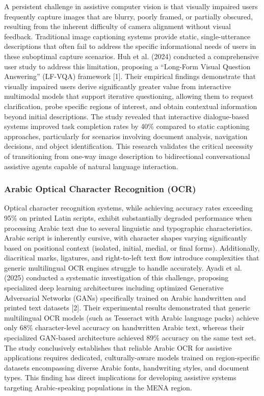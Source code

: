 \documentclass[a4paper]{report}
\begin{document}
A persistent challenge in assistive computer vision is that visually impaired users frequently capture images that are blurry, poorly framed, or partially obscured, resulting from the inherent difficulty of camera alignment without visual feedback. Traditional image captioning systems provide static, single-utterance descriptions that often fail to address the specific informational needs of users in these suboptimal capture scenarios. Huh et al. (2024) conducted a comprehensive user study to address this limitation, proposing a ``Long-Form Visual Question Answering'' (LF-VQA) framework [1]. Their empirical findings demonstrate that visually impaired users derive significantly greater value from interactive multimodal models that support iterative questioning, allowing them to request clarification, probe specific regions of interest, and obtain contextual information beyond initial descriptions. The study revealed that interactive dialogue-based systems improved task completion rates by 40\% compared to static captioning approaches, particularly for scenarios involving document analysis, navigation decisions, and object identification. This research validates the critical necessity of transitioning from one-way image description to bidirectional conversational assistive agents capable of natural language interaction.

\subsubsection{Arabic Optical Character Recognition (OCR)}

Optical character recognition systems, while achieving accuracy rates exceeding 95\% on printed Latin scripts, exhibit substantially degraded performance when processing Arabic text due to several linguistic and typographic characteristics. Arabic script is inherently cursive, with character shapes varying significantly based on positional context (isolated, initial, medial, or final forms). Additionally, diacritical marks, ligatures, and right-to-left text flow introduce complexities that generic multilingual OCR engines struggle to handle accurately. Ayadi et al. (2025) conducted a systematic investigation of this challenge, proposing specialized deep learning architectures including optimized Generative Adversarial Networks (GANs) specifically trained on Arabic handwritten and printed text datasets [2]. Their experimental results demonstrated that generic multilingual OCR models (such as Tesseract with Arabic language packs) achieve only 68\% character-level accuracy on handwritten Arabic text, whereas their specialized GAN-based architecture achieved 89\% accuracy on the same test set. The study conclusively establishes that reliable Arabic OCR for assistive applications requires dedicated, culturally-aware models trained on region-specific datasets encompassing diverse Arabic fonts, handwriting styles, and document types. This finding has direct implications for developing assistive systems targeting Arabic-speaking populations in the MENA region.
\end{document}
